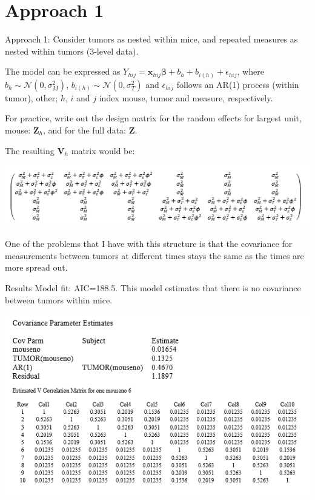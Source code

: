 \documentclass[
  9pt,
  ignorenonframetext,
]{beamer}
\begin{document}
\hypertarget{approach-1}{%
\section{Approach 1}\label{approach-1}}

\begin{frame}{Approach 1:}
\protect\hypertarget{approach-1-1}{}
Consider tumors as nested within mice, and repeated measures as nested
within tumors (3-level data).

The model can be expressed as
\(Y_{hij}=\pmb x_{hij} {\pmb \beta}+b_h+b_{i(h)}+\epsilon_{hij}\), where
\(b_h\sim \mathcal N(0,\sigma_M^2)\),
\(b_{i(h)}\sim \mathcal N(0,\sigma_T^2)\) and \(\epsilon_{hij}\) follows
an AR(1) process (within tumor), other; \(h\), \(i\) and \(j\) index
mouse, tumor and measure, respectively.

For practice, write out the design matrix for the random effects for
largest unit, mouse: \(\pmb Z_h\), and for the full data: \(\pmb Z\).

The resulting \(\pmb V_h\) matrix would be:

\begin{center}\includegraphics[width=1\linewidth]{figs_L11/f0} \end{center}

One of the problems that I have with this structure is that the
covariance for measurements between tumors at different times stays the
same as the times are more spread out.
\end{frame}

\begin{frame}{Results}
\protect\hypertarget{results}{}
Model fit: AIC=188.5. This model estimates that there is no covariance
between tumors within mice.

\begin{center}\includegraphics[width=1\linewidth]{figs_L11/f2} \end{center}
\end{frame}
\end{document}
